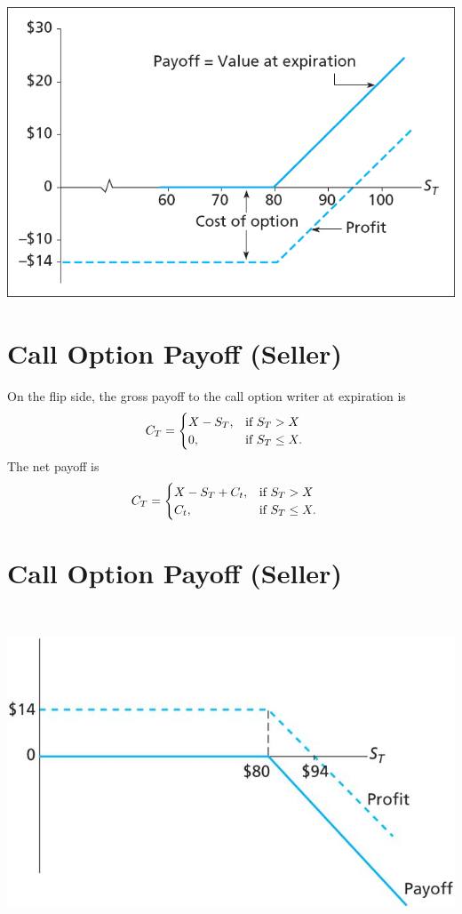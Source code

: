 \documentclass[letterpaper,10pt,english]{sphinxmanual}
\begin{document}
\includegraphics[width=6in]{bod34698_1502_lg.jpg}


\section{Call Option Payoff (Seller)}
\label{options:call-option-payoff-seller}
On the flip side, the gross payoff to the call option writer at
expiration is
\begin{gather}
\begin{split}C_T & = \begin{cases} X - S_T, & \text{if  } S_T > X
\\ 0, & \text{if  } S_T \leq X. \end{cases}\end{split}\notag
\end{gather}
The net payoff is
\begin{gather}
\begin{split}C_T & = \begin{cases} X - S_T + C_t, & \text{if  } S_T > X
\\ C_t, & \text{if  } S_T \leq X. \end{cases}\end{split}\notag
\end{gather}

\section{Call Option Payoff (Seller)}
\label{options:id9}
$\qquad$

\includegraphics[width=6in]{bod34698_1503_lg.jpg}
\end{document}
